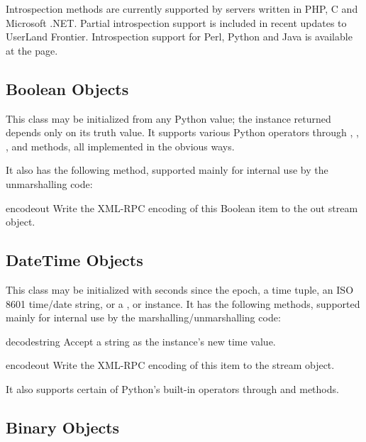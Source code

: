 Introspection methods are currently supported by servers written in
PHP, C and Microsoft .NET. Partial introspection support is included
in recent updates to UserLand Frontier. Introspection support for
Perl, Python and Java is available at the  page.


\subsection{Boolean Objects \label{boolean-objects}}

This class may be initialized from any Python value; the instance
returned depends only on its truth value.  It supports various Python
operators through , ,
, and  methods, all
implemented in the obvious ways.

It also has the following method, supported mainly for internal use by
the unmarshalling code:

\begin{methoddesc}{encode}{out}
Write the XML-RPC encoding of this Boolean item to the out stream object.
\end{methoddesc}


\subsection{DateTime Objects \label{datetime-objects}}

This class may be initialized with seconds since the epoch, a time tuple, an
ISO 8601 time/date string, or a {},
{} or {}
instance.  It has the following methods, supported mainly for internal use
by the marshalling/unmarshalling code:

\begin{methoddesc}{decode}{string}
Accept a string as the instance's new time value.
\end{methoddesc}

\begin{methoddesc}{encode}{out}
Write the XML-RPC encoding of this  item to the
 stream object.
\end{methoddesc}

It also supports certain of Python's built-in operators through 
 and  methods.


\subsection{Binary Objects \label{binary-objects}}

